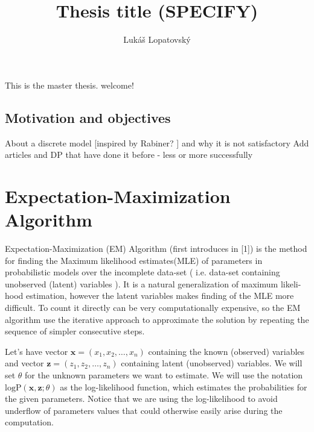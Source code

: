 \documentclass[thesis=M,english]{FITthesis}[2012/10/20]
\title{Thesis title (SPECIFY)}
\author{Luk{\' a}{\v s} Lopatovsk{\' y}} %
\begin{document}


\begin{introduction}
	This is the master thesis. welcome!
	\section{Motivation and objectives}
	About a discrete model [inspired by Rabiner? ] and why it is not satisfactory  %
	Add articles and DP that have done it before - less or more successfully 
\end{introduction}


\chapter{Expectation-Maximization Algorithm}\label{ch:EM}



Expectation-Maximization (EM) Algorithm (first introduces in [1]) is the method for finding the Maximum likelihood estimates(MLE) of parameters in probabilistic models over the incomplete data-set ( i.e. data-set containing unobserved (latent) variables ). It is a natural generalization of maximum likeli-
hood estimation, however the latent variables makes finding of the MLE more difficult. To count it directly can be very computationally expensive, so the EM algorithm use the iterative approach to approximate the solution by repeating the sequence of simpler consecutive steps.

Let's have vector $\mathbf{x} = (x_{1},x_{2},\dotsc,x_{n})$ containing the known (observed) variables and vector $\mathbf{z} = (z_{1},z_{2},\dotsc,z_{n})$ containing latent (unobserved) variables. We will set $\theta$ for the unknown parameters we want to estimate. We will use the notation $\mathrm{logP}(\mathbf{x},\mathbf{z};\theta)$ as the log-likelihood function, which estimates the probabilities for the given parameters. Notice that we are using the log-likelihood to avoid underflow of parameters values that could otherwise easily arise during the computation.  
\end{document}
